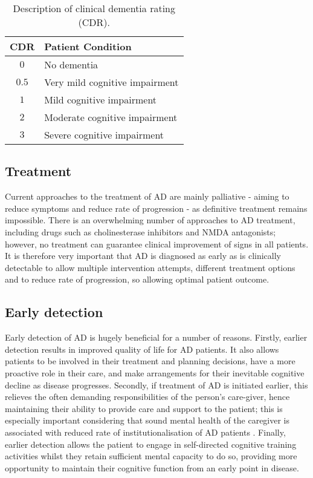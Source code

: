 \documentclass[
    author={Kai Hulme},
    supervisor={Dr Jon Bird},
    degree={BSc},
    title={Generative Adversarial Networks as an Augmentation Technique},
    subtitle={for Alzheimer's Disease Detection in MRI Volumes},
    type={Research},
    year={2021} 
]{dissertation}
\begin{document}
\begin{table}[t]
\centering
\begin{tabular}{|c|l|}
\hline
\textbf{CDR} & \textbf{Patient Condition} \\
\hline
$ 0 $ & No dementia \\
$ 0.5 $ & Very mild cognitive impairment \\
$ 1 $ & Mild cognitive impairment \\
$ 2 $ & Moderate cognitive impairment \\
$ 3 $ & Severe cognitive impairment \\
\hline
\end{tabular}
\caption{Description of clinical dementia rating (CDR). \cite{mckhann1984clinical}}
\label{table:cdr_rating_description}
\end{table}

\subsection{Treatment}

Current approaches to the treatment of AD are mainly palliative - aiming to reduce symptoms and reduce rate of progression - as definitive treatment remains impossible. There is an overwhelming number of approaches to AD treatment, including drugs such as cholinesterase inhibitors and NMDA antagonists; however, no treatment can guarantee clinical improvement of signs in all patients.  It is therefore very important that AD is diagnosed as early as is clinically detectable to allow multiple intervention attempts, different treatment options and to reduce rate of progression, so allowing optimal patient outcome. 

\subsection{Early detection}

Early detection of AD is hugely beneficial for a number of reasons. Firstly, earlier detection results in improved quality of life for AD patients. It also allows patients to be involved in their treatment and planning decisions, have a more proactive role in their care, and make arrangements for their inevitable cognitive decline as disease progresses. Secondly, if treatment of AD is initiated earlier, this relieves the often demanding responsibilities of the person's care-giver, hence maintaining their ability to provide care and support to the patient; this is especially important considering that sound mental health of the caregiver is associated with reduced rate of institutionalisation of AD patients \cite{todd2009alzheimers}. Finally, earlier detection allows the patient to engage in self-directed cognitive training activities whilst they retain sufficient mental capacity to do so, providing more opportunity to maintain their cognitive function from an early point in disease.
\\
\end{document}
